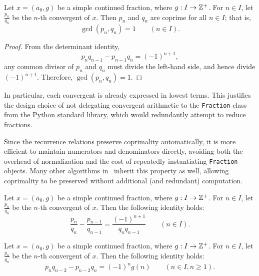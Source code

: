\begin{corollary}
    \label{coro:coprimality}
    Let $x = (a_0, g)$ be a simple continued fraction, where $g: I \to \mathbb{Z}^+$. 
    For $n \in I$, let $\frac{p_n}{q_n}$ be the $n$-th convergent of $x$. Then $p_n$ and $q_n$ are 
    coprime for all $n \in I$; that is,
    \[
        \gcd(p_n, q_n) = 1 \qquad (n \in I).
    \]
\end{corollary}

\begin{proof}
    From the determinant identity,
    \[
        p_n q_{n-1} - p_{n-1} q_n = (-1)^{n+1},
    \]
    any common divisor of $p_n$ and $q_n$ must divide the left-hand side, and hence divide $(-1)^{n+1}$. 
    Therefore, $\gcd(p_n, q_n) = 1$.
\end{proof}

\begin{remark}
    In particular, each convergent is already expressed in lowest terms. This justifies 
    the design choice of not delegating convergent arithmetic to the \texttt{Fraction} 
    class from the Python standard library, which would redundantly attempt to reduce 
    fractions.

    Since the recurrence relations preserve coprimality automatically, it is more 
    efficient to maintain numerators and denominators directly, avoiding both the 
    overhead of normalization and the cost of repeatedly instantiating \texttt{Fraction} 
    objects. Many other algorithms in \catena\ inherit this property as well, allowing 
    coprimality to be preserved without additional (and redundant) computation.
\end{remark}

\begin{corollary}
    \label{coro:difference_consecutive_convergents}
    Let $x = (a_0, g)$ be a simple continued fraction, where $g: I \to \mathbb{Z}^+$. 
    For $n \in I$, let $\frac{p_n}{q_n}$ be the $n$-th convergent of $x$. Then the following identity holds:
    \[
        \frac{p_n}{q_n} - \frac{p_{n-1}}{q_{n-1}} = \frac{(-1)^{n+1}}{q_n q_{n-1}} \qquad (n \in I).
    \]
\end{corollary}

\begin{theorem}
    Let $x = (a_0, g)$ be a simple continued fraction, where $g: I \to \mathbb{Z}^+$. 
    For $n \in I$, let $\frac{p_n}{q_n}$ be the $n$-th convergent of $x$. Then the following identity holds:
    \[
        p_n q_{n-2} - p_{n-2} q_n = (-1)^n g(n) \qquad (n \in I, n \geq 1).
    \]
\end{theorem}

